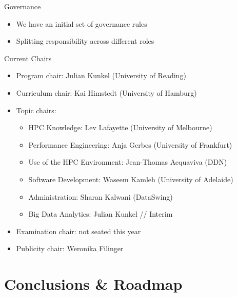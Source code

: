\documentclass[compress,aspectratio=169]{beamer}
\begin{document}
\begin{frame}{Governance}

    \begin{itemize}
      \item We have an initial set of governance rules
      \item Splitting responsibility across different roles
    \end{itemize}


  \begin{block}{Current Chairs}
  \vspace*{-0.5em}
  \begin{itemize}
    \item Program chair: Julian Kunkel (University of Reading)
    \item Curriculum chair: Kai Himstedt (University of Hamburg)
    \item  Topic chairs:
    \begin{itemize}
      \item HPC Knowledge: Lev Lafayette (University of Melbourne)
      \item Performance Engineering: Anja Gerbes (University of Frankfurt)
      \item Use of the HPC Environment: Jean-Thomas Acquaviva (DDN)
      \item Software Development: Waseem Kamleh (University of Adelaide)
			\item Administration: Sharan Kalwani (DataSwing)
			\item Big Data Analytics: Julian Kunkel // Interim
    \end{itemize}
    \item Examination chair: not seated this year
    \item Publicity chair: Weronika Filinger
  \end{itemize}
  \end{block}
\end{frame}


\section{Conclusions \& Roadmap}
\sectionIntroHidden
\end{document}
